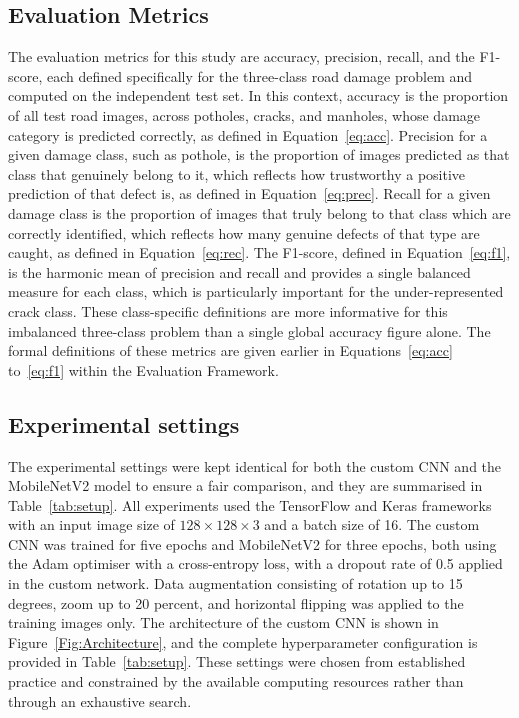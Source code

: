 \documentclass[preprint,12pt]{elsarticle}
\begin{document}
\subsection{Evaluation Metrics}

The evaluation metrics for this study are accuracy, precision, recall, and the F1-score, each defined specifically for the three-class road damage problem and computed on the independent test set.
In this context, accuracy is the proportion of all test road images, across potholes, cracks, and manholes, whose damage category is predicted correctly, as defined in Equation~\eqref{eq:acc}.
Precision for a given damage class, such as pothole, is the proportion of images predicted as that class that genuinely belong to it, which reflects how trustworthy a positive prediction of that defect is, as defined in Equation~\eqref{eq:prec}.
Recall for a given damage class is the proportion of images that truly belong to that class which are correctly identified, which reflects how many genuine defects of that type are caught, as defined in Equation~\eqref{eq:rec}.
The F1-score, defined in Equation~\eqref{eq:f1}, is the harmonic mean of precision and recall and provides a single balanced measure for each class, which is particularly important for the under-represented crack class.
These class-specific definitions are more informative for this imbalanced three-class problem than a single global accuracy figure alone.
The formal definitions of these metrics are given earlier in Equations~\eqref{eq:acc} to~\eqref{eq:f1} within the Evaluation Framework.

\subsection{Experimental settings}

The experimental settings were kept identical for both the custom CNN and the MobileNetV2 model to ensure a fair comparison, and they are summarised in Table~\ref{tab:setup}.
All experiments used the TensorFlow and Keras frameworks with an input image size of $128 \times 128 \times 3$ and a batch size of 16.
The custom CNN was trained for five epochs and MobileNetV2 for three epochs, both using the Adam optimiser with a cross-entropy loss, with a dropout rate of 0.5 applied in the custom network.
Data augmentation consisting of rotation up to 15 degrees, zoom up to 20 percent, and horizontal flipping was applied to the training images only.
The architecture of the custom CNN is shown in Figure~\ref{Fig:Architecture}, and the complete hyperparameter configuration is provided in Table~\ref{tab:setup}.
These settings were chosen from established practice and constrained by the available computing resources rather than through an exhaustive search.
\end{document}
